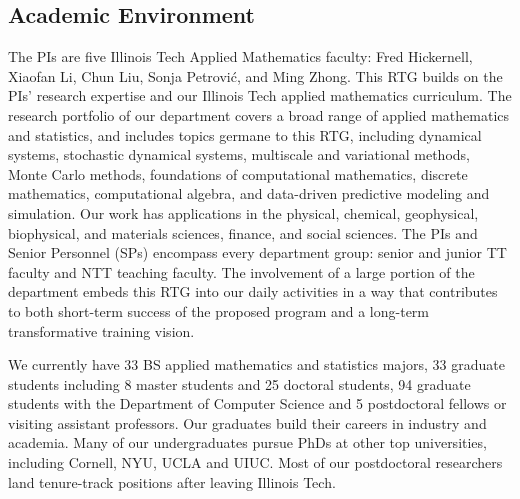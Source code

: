 \documentclass[11pt]{NSFamsart}
\newcommand{\numUG}{33\xspace}
\newcommand{\numMS}{8\xspace}
\newcommand{\numPHD}{25\xspace}
\newcommand{\numGrad}{33\xspace}
\newcommand{\numPostDoc}{5\xspace}
\newcommand{\numjoint}{94\xspace}
\begin{document}
\subsection*{Academic Environment} The PIs are five Illinois Tech Applied Mathematics faculty:  %
Fred Hickernell, Xiaofan Li, Chun Liu, Sonja Petrovi\'c, and Ming Zhong. This RTG builds on the PIs' research expertise and our Illinois Tech applied mathematics curriculum.   The research portfolio of our department covers a broad range of applied mathematics and statistics, and includes topics germane to this RTG, including dynamical systems, stochastic dynamical systems, multiscale and variational methods,  Monte Carlo methods, foundations of computational mathematics, discrete mathematics, computational algebra, and data-driven predictive modeling and simulation. Our work has applications in the physical, chemical, geophysical, biophysical, and materials sciences, finance, and social sciences. 
The PIs and Senior Personnel (SPs) encompass every department group: senior and junior TT faculty and NTT teaching faculty. The involvement of a large portion of the department embeds this RTG into our daily activities in a way that contributes to both short-term success of the proposed program and a long-term transformative training vision. 

 We currently have \numUG BS applied mathematics and statistics majors, \numGrad graduate students including \numMS master students and \numPHD doctoral students, \numjoint graduate students with the Department of Computer Science and \numPostDoc postdoctoral fellows or visiting assistant professors. Our graduates build their careers in  industry  and academia. Many of our undergraduates pursue PhDs at other top universities, including Cornell, NYU, UCLA and UIUC. Most of our postdoctoral researchers land tenure-track positions after leaving Illinois Tech.
\end{document}
